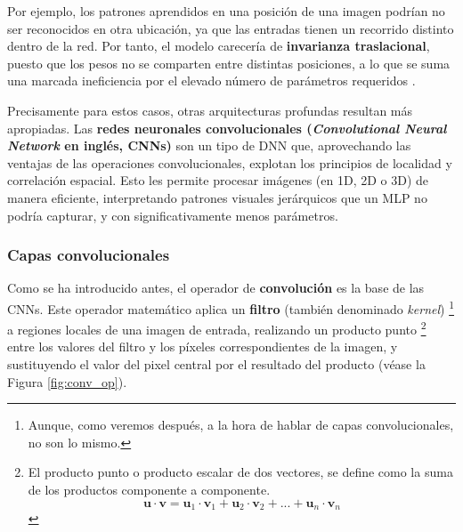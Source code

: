 Por ejemplo, los patrones aprendidos en una posición de una imagen podrían no ser reconocidos en otra 
ubicación, ya que las entradas tienen un recorrido distinto dentro de la red. Por tanto, el modelo carecería       %
de \textbf{invarianza traslacional}, puesto que los pesos no se comparten entre distintas posiciones, a lo que 
se suma una marcada ineficiencia por el elevado número de parámetros requeridos \cite{szeliski2010}.

Precisamente para estos casos, otras arquitecturas profundas resultan más apropiadas.
Las \textbf{redes neuronales convolucionales (\textit{Convolutional Neural Network} en inglés, CNNs)} son un 
tipo de DNN que, aprovechando las ventajas de las operaciones convolucionales, explotan los principios de 
localidad y correlación espacial. Esto les permite procesar imágenes (en 1D, 2D o 3D) de manera eficiente, 
interpretando patrones visuales jerárquicos que un MLP no podría capturar, y con significativamente menos 
parámetros.


\subsubsection{Capas convolucionales}

Como se ha introducido antes, el operador de \textbf{convolución} es la base de las CNNs. Este operador 
matemático aplica un \textbf{filtro} (también denominado \textit{kernel})
\footnote{
    Aunque, como veremos después, a la hora de hablar de capas convolucionales, no son lo mismo.
} 
a regiones locales de una imagen de entrada, realizando un producto punto
\footnote{
    El producto punto o producto escalar de dos vectores, se define como la suma de los productos componente a 
    componente. 
    $$
    \mathbf{u} \cdot \mathbf{v} = \mathbf{u}_1 \cdot \mathbf{v}_1 + \mathbf{u}_2 \cdot \mathbf{v}_2 + ... + 
    \mathbf{u}_n \cdot \mathbf{v}_n
    $$
} 
entre los valores del filtro y los píxeles correspondientes de la imagen, y sustituyendo el valor del pixel 
central por el resultado del producto (véase la Figura \ref{fig:conv_op}).


